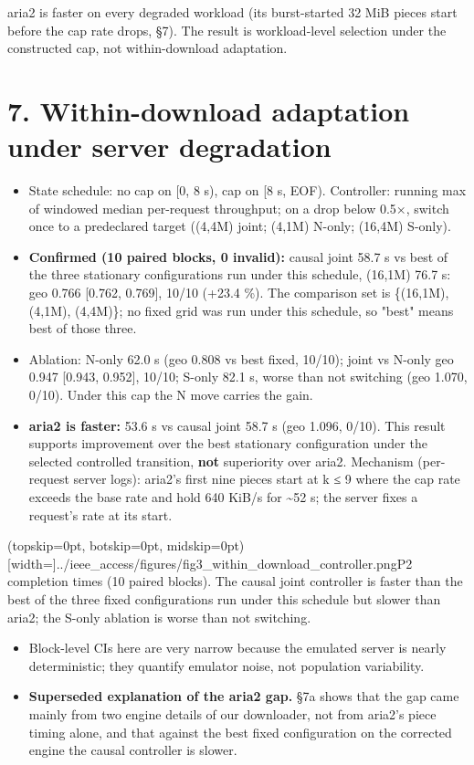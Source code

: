 \documentclass{ieeeaccess}
\begin{document}
aria2 is faster on every degraded workload (its burst-started 32 MiB pieces start before the cap rate drops, §7). The result is workload-level selection under the constructed cap, not within-download adaptation.


\section*{7. Within-download adaptation under server degradation}

\begin{itemize}
\item State schedule: no cap on [0, 8 s), cap on [8 s, EOF). Controller: running max of windowed median per-request throughput; on a drop below 0.5×, switch once to a predeclared target ((4,4M) joint; (4,1M) N-only; (16,4M) S-only).
\item \textbf{Confirmed (10 paired blocks, 0 invalid):} causal joint 58.7 s vs best of the three stationary configurations run under this schedule, (16,1M) 76.7 s: geo 0.766 [0.762, 0.769], 10/10 (+23.4 \%). The comparison set is \{(16,1M), (4,1M), (4,4M)\}; no fixed grid was run under this schedule, so "best" means best of those three.
\item Ablation: N-only 62.0 s (geo 0.808 vs best fixed, 10/10); joint vs N-only geo 0.947 [0.943, 0.952], 10/10; S-only 82.1 s, worse than not switching (geo 1.070, 0/10). Under this cap the N move carries the gain.
\item \textbf{aria2 is faster:} 53.6 s vs causal joint 58.7 s (geo 1.096, 0/10). This result supports improvement over the best stationary configuration under the selected controlled transition, \textbf{not} superiority over aria2. Mechanism (per-request server logs): aria2's first nine pieces start at k ≤ 9 where the cap rate exceeds the base rate and hold 640 KiB/s for \textasciitilde{}52 s; the server fixes a request's rate at its start.
\end{itemize}
\Figure[t!](topskip=0pt, botskip=0pt, midskip=0pt)[width=\columnwidth]{../ieee_access/figures/fig3_within_download_controller.png}{P2 completion times (10 paired blocks). The causal joint controller is faster than the best of the three fixed configurations run under this schedule but slower than aria2; the S-only ablation is worse than not switching.}

\begin{itemize}
\item Block-level CIs here are very narrow because the emulated server is nearly deterministic; they quantify emulator noise, not population variability.
\item \textbf{Superseded explanation of the aria2 gap.} §7a shows that the gap came mainly from two engine details of our downloader, not from aria2's piece timing alone, and that against the best fixed configuration on the corrected engine the causal controller is slower.
\end{itemize}
\end{document}
